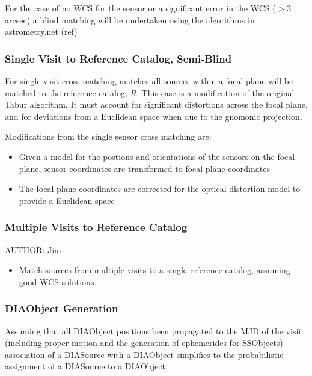 For the case of no WCS for the sensor or a significant error in the
WCS ($> 3$ arcsec) a blind matching will be undertaken using the
algorithms in astrometry.net (ref)

\subsubsection{Single Visit to Reference Catalog, Semi-Blind}
\label{sec:acSingleVisitReferenceMatching}

For single visit cross-matching matches all sources within a focal
plane will be matched to the reference catalog, $R$. This case is a
modification of the original Tabur algorithm. It must account for 
significant distortions across the focal plane, and for deviations from a Euclidean space when due to the gnomonic projection.

Modifications from the single sensor cross matching are:
\begin{itemize}
\item Given a model for the postions and orientations of the sensors
  on the focal plane, sensor coordinates are transformed to focal plane
  coordinates 
\item The focal plane coordinates are corrected for the optical distortion model to provide a Euclidean space
\end{itemize}





\subsubsection{Multiple Visits to Reference Catalog}
\label{sec:acJointCalMatching}
AUTHOR: Jim
\begin{itemize}
\item Match sources from multiple visits to a single reference catalog, assuming good WCS solutions.
\end{itemize}

\subsubsection{DIAObject Generation}
\label{sec:acDIAObjectGeneration}

Assuming that all DIAObject positions been propagated to the MJD of
the visit (including proper motion and the generation of ephemerides
for SSObjects) association of a DIASource with a DIAObject simplifies
to the probabilistic assignment of a DIASource to a DIAObject.

